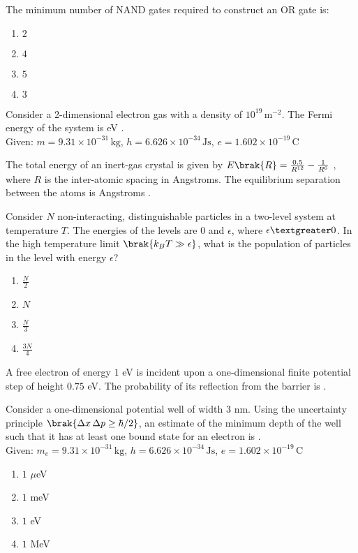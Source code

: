     \item 
    The minimum number of NAND gates required to construct an OR gate is:
    \begin{enumerate}
        \item $2$
        \item $4$
        \item $5$
        \item $3$
    \end{enumerate}
  
    \item 
    Consider a 2-dimensional electron gas with a density of $10^{19} \, \text{m}^{-2}$. The Fermi energy of the system is  eV . \\
    Given: $m = 9.31 \times 10^{-31} \, \text{kg}$, $h = 6.626 \times 10^{-34} \, \text{Js}$, $e = 1.602 \times 10^{-19} \, \text{C}$
    
    \item
    The total energy of an inert-gas crystal is given by $E\brak{R} = \frac{0.5}{R^{12}} - \frac{1}{R^6}$ , where $R$ is the inter-atomic spacing in Angstroms. The equilibrium separation between the atoms is Angstroms .
    
    \item 
    Consider $N$ non-interacting, distinguishable particles in a two-level system at temperature $T$. The energies of the levels are $0$ and $\epsilon$, where $\epsilon \textgreater 0$. In the high temperature limit $\brak{k_B T \gg \epsilon}$, what is the population of particles in the level with energy $\epsilon$?
    \begin{enumerate}
        \item $\frac{N}{2}$
        \item $N$
        \item $\frac{N}{3}$
        \item $\frac{3N}{4}$
    \end{enumerate}
    
    \item 
    A free electron of energy $1$ eV is incident upon a one-dimensional finite potential step of height $0.75$ eV. The probability of its reflection from the barrier is .

    \item 
    Consider a one-dimensional potential well of width $3$ nm. Using the uncertainty principle $\brak{\Delta x \, \Delta p \geq \hbar/2}$, an estimate of the minimum depth of the well such that it has at least one bound state for an electron is . \\
    Given: $m_e = 9.31 \times 10^{-31} \, \text{kg}$, $h = 6.626 \times 10^{-34} \, \text{Js}$, $e = 1.602 \times 10^{-19} \, \text{C}$
    \begin{enumerate}
        \item $1$ $\mu$eV
        \item $1$ meV
        \item $1$ eV
        \item $1$ MeV
    \end{enumerate}
    
